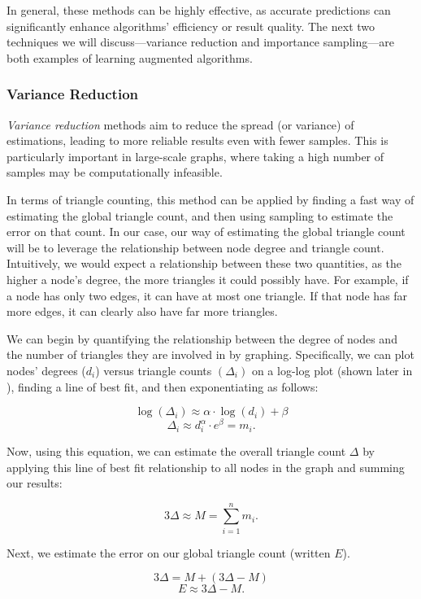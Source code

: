\documentclass[11pt, margin=1in]{article}
\begin{document}
In general, these methods can be highly effective, as accurate predictions can significantly enhance algorithms' efficiency or result quality.
The next two techniques we will discuss—variance reduction and importance sampling—are both examples of learning augmented algorithms.

\subsubsection{Variance Reduction}
\label{sec:variance-reduction-background}

\emph{Variance reduction} methods \cite{prescott_monte_1965} aim to reduce the spread (or variance) of estimations, leading to more reliable results even with fewer samples.
This is particularly important in large-scale graphs, where taking a high number of samples may be computationally infeasible.

In terms of triangle counting, this method can be applied by finding a fast way of estimating the global triangle count, and then using sampling to estimate the error on that count.
In our case, our way of estimating the global triangle count will be to leverage the relationship between node degree and triangle count.
Intuitively, we would expect a relationship between these two quantities, as the higher a node's degree, the more triangles it could possibly have.
For example, if a node has only two edges, it can have at most one triangle.
If that node has far more edges, it can clearly also have far more triangles.

We can begin by quantifying the relationship between the degree of nodes and the number of triangles they are involved in by graphing.
Specifically, we can plot nodes' degrees ($d_i$) versus triangle counts $(\Delta_i)$ on a log-log plot (shown later in ), finding a line of best fit, and then exponentiating as follows:

\[
\log(\Delta_i) \approx \alpha \cdot \log(d_i) + \beta
\]
\[
\Delta_i \approx d_i^\alpha \cdot e^\beta = m_i.
\]

Now, using this equation, we can estimate the overall triangle count $\Delta$ by applying this line of best fit relationship to all nodes in the graph and summing our results:

\[
3\Delta \approx M = \sum_{i = 1}^{n} m_i.
\]

Next, we estimate the error on our global triangle count (written $E$).

\[
3\Delta = M + (3\Delta - M)
\]
\[
E \approx 3\Delta - M.
\]
\end{document}
